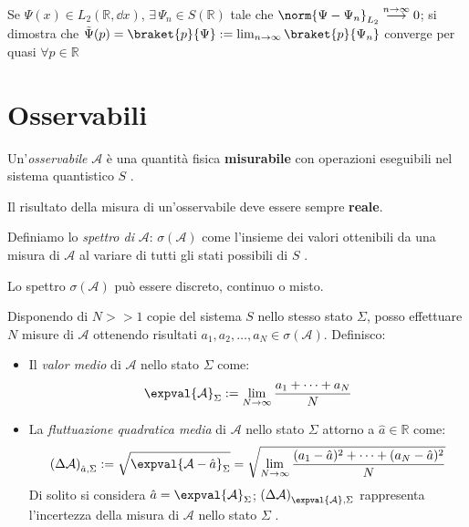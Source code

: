 Se \(\Psi(x) \in L_2(\mathbb{R}, \dd{x})\), \(\exists \, \Psi_n \in S(\mathbb{R})\) tale che \(\norm{\Psi-\Psi_n}_{L_2}\overset{n \to \infty}{\longrightarrow} 0\); 
si dimostra che \(\tilde{\Psi}(p)= \braket{p}{\Psi} : = \lim_{n\to \infty}\braket{p}{\Psi_n}\) converge per quasi \(\forall p \in \mathbb{R}\)


\section{Osservabili}
\begin{definition}
    Un'\textit{osservabile} \(\mathcal{A}\) è una quantità fisica \textbf{misurabile} con operazioni eseguibili nel sistema quantistico \(S\) .
\end{definition}
Il risultato della misura di un'osservabile deve essere sempre \textbf{reale}.

\begin{definition}
    Definiamo lo \textit{spettro di} \(\mathcal{A} \): \(\sigma(\mathcal{A})\) come l'insieme dei valori ottenibili da una
    misura di \(\mathcal{A}\) al variare di tutti gli stati possibili di \(S\) .
\end{definition}

Lo spettro \(\sigma(\mathcal{A})\) può essere discreto, continuo o misto.

\begin{definition}
    Disponendo di \(N >> 1 \) copie del sistema \(S\) nello stesso stato \(\Sigma\), posso effettuare \(N\) misure di \(\mathcal{A}\) 
    ottenendo risultati \(a_1,a_2,\dots, a_N \in \sigma(\mathcal{A})\). Definisco:
    \begin{itemize}
        \item Il \textit{valor medio} di \(\mathcal{A}\) nello stato \(\Sigma\) come: 
        \begin{equation}
            \expval{\mathcal{A}}_\Sigma := \lim_{N\to \infty} \frac{a_1+\dots+a_N}{N}
        \end{equation}
        \item La \textit{fluttuazione quadratica media} di \(\mathcal{A}\) nello stato \(\Sigma\) attorno a \(\hat{a} \in \mathbb{R}\) come: 
        \begin{equation}
            \left( \Delta \mathcal{A} \right)_{\hat{a}, \Sigma}:= \sqrt{\expval{\mathcal{A}- \hat{a}}_\Sigma}= \sqrt{\lim_{N \to \infty} \frac{(a_1-\hat{a})^2+ \dots+ (a_N-\hat{a})^2}{N}}
        \end{equation} 
        Di solito si considera \(\hat{a}= \expval{\mathcal{A}}_\Sigma\); \(\left( \Delta\mathcal{A} \right)_{\expval{\mathcal{A}}, \Sigma}\) rappresenta l'incertezza della misura di \(\mathcal{A}\) nello stato \(\Sigma\) .
    \end{itemize}
\end{definition}

